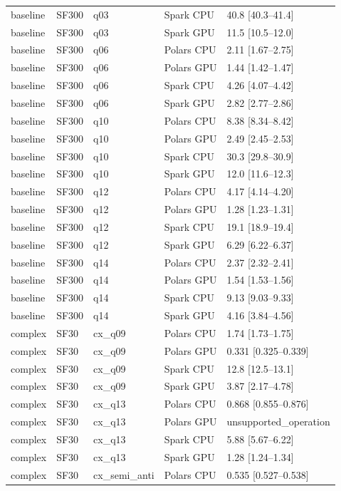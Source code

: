 \begin{longtable}{lllll}
baseline & SF300 & q03 & Spark CPU & 40.8 [40.3--41.4] \\
baseline & SF300 & q03 & Spark GPU & 11.5 [10.5--12.0] \\
baseline & SF300 & q06 & Polars CPU & 2.11 [1.67--2.75] \\
baseline & SF300 & q06 & Polars GPU & 1.44 [1.42--1.47] \\
baseline & SF300 & q06 & Spark CPU & 4.26 [4.07--4.42] \\
baseline & SF300 & q06 & Spark GPU & 2.82 [2.77--2.86] \\
baseline & SF300 & q10 & Polars CPU & 8.38 [8.34--8.42] \\
baseline & SF300 & q10 & Polars GPU & 2.49 [2.45--2.53] \\
baseline & SF300 & q10 & Spark CPU & 30.3 [29.8--30.9] \\
baseline & SF300 & q10 & Spark GPU & 12.0 [11.6--12.3] \\
baseline & SF300 & q12 & Polars CPU & 4.17 [4.14--4.20] \\
baseline & SF300 & q12 & Polars GPU & 1.28 [1.23--1.31] \\
baseline & SF300 & q12 & Spark CPU & 19.1 [18.9--19.4] \\
baseline & SF300 & q12 & Spark GPU & 6.29 [6.22--6.37] \\
baseline & SF300 & q14 & Polars CPU & 2.37 [2.32--2.41] \\
baseline & SF300 & q14 & Polars GPU & 1.54 [1.53--1.56] \\
baseline & SF300 & q14 & Spark CPU & 9.13 [9.03--9.33] \\
baseline & SF300 & q14 & Spark GPU & 4.16 [3.84--4.56] \\
complex & SF30 & cx\_q09 & Polars CPU & 1.74 [1.73--1.75] \\
complex & SF30 & cx\_q09 & Polars GPU & 0.331 [0.325--0.339] \\
complex & SF30 & cx\_q09 & Spark CPU & 12.8 [12.5--13.1] \\
complex & SF30 & cx\_q09 & Spark GPU & 3.87 [2.17--4.78] \\
complex & SF30 & cx\_q13 & Polars CPU & 0.868 [0.855--0.876] \\
complex & SF30 & cx\_q13 & Polars GPU & unsupported\_operation \\
complex & SF30 & cx\_q13 & Spark CPU & 5.88 [5.67--6.22] \\
complex & SF30 & cx\_q13 & Spark GPU & 1.28 [1.24--1.34] \\
complex & SF30 & cx\_semi\_anti & Polars CPU & 0.535 [0.527--0.538] \\

\end{longtable}
